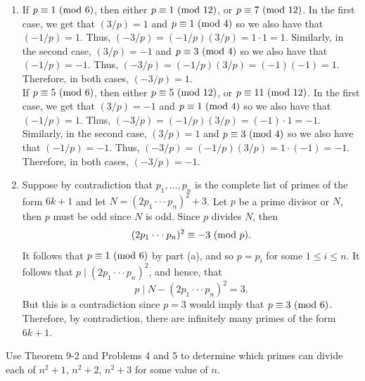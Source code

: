 \begin{solution}
    \begin{enumerate}
        \item If $p \equiv 1 \ (\mathrm{mod}\ 6)$, then either $p \equiv 1 \ (\mathrm{mod}\ 12)$, or $p \equiv 7 \ (\mathrm{mod}\ 12)$. In the first case, we get that $(3/p) = 1$ and $p \equiv 1 \ (\mathrm{mod}\ 4)$ so we also have that $(-1/p) = 1$. Thus, $(-3/p) = (-1/p)(3/p) = 1\cdot 1 = 1$. Similarly, in the second case, $(3/p) = -1$ and $p \equiv 3 \ (\mathrm{mod}\ 4)$ so we also have that $(-1/p) = -1$. Thus, $(-3/p) = (-1/p)(3/p) = (-1)(-1) = 1$. Therefore, in both cases, $(-3/p) = 1$.\\
        
        If $p \equiv 5 \ (\mathrm{mod}\ 6)$, then either $p \equiv 5 \ (\mathrm{mod}\ 12)$, or $p \equiv 11 \ (\mathrm{mod}\ 12)$. In the first case, we get that $(3/p) = -1$ and $p \equiv 1 \ (\mathrm{mod}\ 4)$ so we also have that $(-1/p) = 1$. Thus, $(-3/p) = (-1/p)(3/p) = (-1)\cdot 1 = -1$. Similarly, in the second case, $(3/p) = 1$ and $p \equiv 3 \ (\mathrm{mod}\ 4)$ so we also have that $(-1/p) = -1$. Thus, $(-3/p) = (-1/p)(3/p) = 1\cdot (-1) = -1$. Therefore, in both cases, $(-3/p) = -1$.
        \item Suppose by contradiction that $p_1, ..., p_n$ is the complete list of primes of the form $6k+1$ and let $N = (2p_1\cdot \cdot \cdot p_n)^2 + 3$. Let $p$ be a prime divisor or $N$, then $p$ must be odd since $N$ is odd. Since $p$ divides $N$, then
        $$(2p_1\cdot \cdot \cdot p_n)^2 \equiv -3 \ (\mathrm{mod}\ p).$$
        It follows that $p \equiv 1 \ (\mathrm{mod}\ 6)$ by part (a), and so $p = p_i$ for some $1 \leq i \leq n$. It follows that $p \mid (2p_1 \cdot \cdot \cdot p_n)^2$, and hence, that
        $$p \mid N - (2p_1 \cdot \cdot \cdot p_n)^2 = 3.$$
        But this is a contradiction since $p = 3$ would imply that $p \equiv 3 \ (\mathrm{mod}\ 6)$. Therefore, by contradiction, there are infinitely many primes of the form $6k+1$. \\
    \end{enumerate}
\end{solution}

\begin{exercise}
    Use Theorem 9-2 and Problems 4 and 5 to determine which primes can divide each of $n^2 + 1$, $n^2 + 2$, $n^2 + 3$ for some value of $n$. \\
\end{exercise}

